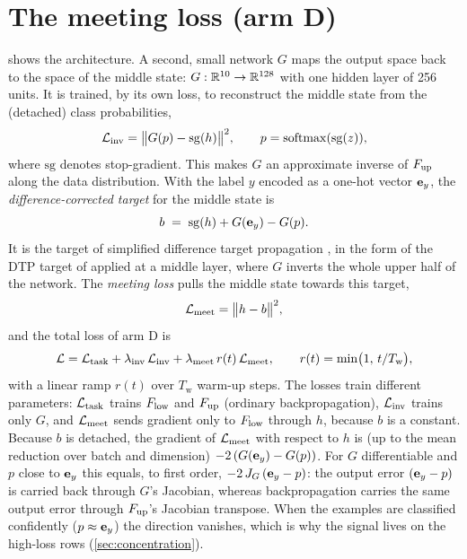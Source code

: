 \section{The meeting loss (arm D)}\label{sec:meeting}
 shows the architecture. A second, small network $G$ maps the output space back to the space of the middle state: $G:\mathbb{R}^{10}\to\mathbb{R}^{128}$ with one hidden layer of 256 units. It is trained, by its own loss, to reconstruct the middle state from the (detached) class probabilities,
\begin{equation}
\mathcal{L}_{\mathrm{inv}} = \big\|G(p)-\mathrm{sg}(h)\big\|^2 ,\qquad p=\mathrm{softmax}(\mathrm{sg}(z)),
\end{equation}
where $\mathrm{sg}$ denotes stop-gradient. This makes $G$ an approximate inverse of $F_{\mathrm{up}}$ along the data distribution. With the label $y$ encoded as a one-hot vector $\mathbf{e}_y$, the \emph{difference-corrected target} for the middle state is
\begin{equation}
b \;=\; \mathrm{sg}(h) + G(\mathbf{e}_y) - G(p).
\end{equation}
It is the target of simplified difference target propagation \citep{bartunov2018assessing}, in the form of the DTP target of \citet{lee2015dtp} applied at a middle layer, where $G$ inverts the whole upper half of the network. The \emph{meeting loss} pulls the middle state towards this target,
\begin{equation}
\mathcal{L}_{\mathrm{meet}} = \big\|h - b\big\|^2 ,
\end{equation}
and the total loss of arm D is
\begin{equation}
\mathcal{L} = \mathcal{L}_{\mathrm{task}} + \lambda_{\mathrm{inv}}\,\mathcal{L}_{\mathrm{inv}} + \lambda_{\mathrm{meet}}\,r(t)\,\mathcal{L}_{\mathrm{meet}},\qquad r(t)=\min\!\big(1,\, t/T_{\mathrm{w}}\big),
\end{equation}
with a linear ramp $r(t)$ over $T_{\mathrm{w}}$ warm-up steps. The losses train different parameters: $\mathcal{L}_{\mathrm{task}}$ trains $F_{\mathrm{low}}$ and $F_{\mathrm{up}}$ (ordinary backpropagation), $\mathcal{L}_{\mathrm{inv}}$ trains only $G$, and $\mathcal{L}_{\mathrm{meet}}$ sends gradient only to $F_{\mathrm{low}}$ through $h$, because $b$ is a constant. Because $b$ is detached, the gradient of $\mathcal{L}_{\mathrm{meet}}$ with respect to $h$ is (up to the mean reduction over batch and dimension) $-2\,(G(\mathbf{e}_y)-G(p))$. For $G$ differentiable and $p$ close to $\mathbf{e}_y$ this equals, to first order, $-2\,J_G\,(\mathbf{e}_y-p)$: the output error $(\mathbf{e}_y-p)$ is carried back through $G$'s Jacobian, whereas backpropagation carries the same output error through $F_{\mathrm{up}}$'s Jacobian transpose. When the examples are classified confidently ($p\approx\mathbf{e}_y$) the direction vanishes, which is why the signal lives on the high-loss rows (\cref{sec:concentration}).

